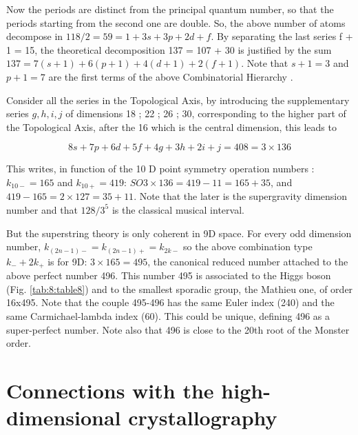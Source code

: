 \documentclass[a4paper,9pt]{article}
\begin{document}
     Now the periods are distinct from the principal quantum number, so that the periods starting from the second one are double. So, the above number of atoms decompose in $118/2 = 59 = 1 + 3s + 3p + 2d + f$.  By separating the last series f + 1 = 15, the theoretical decomposition 137 = 107 + 30 is justified by the sum $137 = 7(s +1) + 6(p +1) + 4(d +1) + 2(f +1)$. Note that $s + 1 = 3$ and $p + 1 = 7$ are the first terms of the above Combinatorial Hierarchy\cite{Bastin} .



     Consider all the series in the Topological Axis, by introducing the supplementary series $g, h, i, j$ of dimensions 18 ; 22 ; 26 ; 30, corresponding to the higher part of the Topological Axis, after the 16 which is the central dimension, this leads to
     
     \begin{equation}
      8s + 7p + 6 d + 5f + 4g + 3h + 2i + j = 408 = 3 \times 136   
     \end{equation}
      
     
     This writes, in function of the 10 D point symmetry operation numbers :  $k_{10-} = 165$ and $k_{10+} = 419$: $SO3 \times 136 = 419 - 11 = 165 + 35$, and $419-165 = 2 \times 127 =  35 + 11$. Note that the later is the supergravity dimension number and that $128/3^5$ is the classical musical interval. 
     
     
     But the superstring theory is only coherent in 9D space. For every odd dimension number, $k_{(2n - 1)-} = k_{(2n - 1)+} = k_{2k-}$ so the above combination type $k_- + 2k_+$ is for 9D: $3 \times 165 = 495$, the canonical reduced number attached to the above perfect number 496. This number 495 is associated to the Higgs boson (Fig. \ref{tab:8:table8}) and to the smallest sporadic group, the Mathieu one, of order 16x495. Note that the couple 495-496 has the same Euler index (240) and the same Carmichael-lambda index (60). This could be unique, defining 496 as a super-perfect number. Note also that 496 is close to the 20th root of the Monster order.
 
 
 
 
 
 
 
 
 
 \section{Connections with the high-dimensional crystallography}
 
\end{document}
